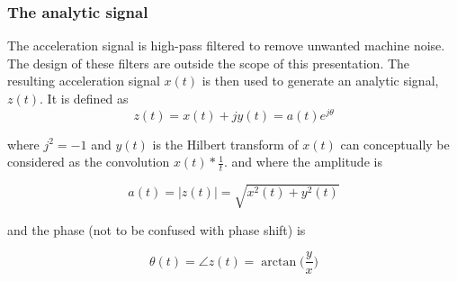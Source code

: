 \begin{frame}
    \frametitle{The analytic signal}
    \small
    The acceleration signal is high-pass filtered to remove unwanted machine noise.  The design of these filters are outside the scope of this presentation.  The resulting acceleration signal $x(t)$ is then used to generate an analytic signal, $z(t)$.  It is defined as 
    \begin{equation}
        z(t) = x(t) + j y(t) = a(t) e^{j\theta}
    \end{equation}
    
    where $j^2=-1$ and $y(t)$ is the Hilbert transform of $x(t)$ can conceptually be considered as the convolution $x(t) * \frac{1}{t}$. and where the amplitude is
    
    \begin{equation}
        a(t) = \mid{z(t)}\mid = \sqrt{x^2(t)+y^2(t)}
    \end{equation}
    
    and the phase (not to be confused with phase shift) is
    
    \begin{equation}
        \theta(t) = \angle{z(t)} = \arctan\Big(\frac{y}{x}\Big)
    \end{equation}
   
\end{frame}